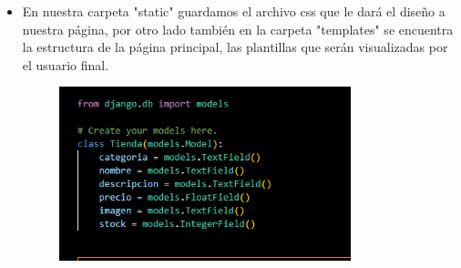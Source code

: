 \documentclass{article}
\begin{document}
 \begin{itemize}
		\item   En nuestra carpeta "static" guardamos el archivo css que le dará el diseño a nuestra página, por otro lado también en la carpeta "templates" se encuentra la estructura de la página principal, las plantillas que serán visualizadas por el usuario final. 
	\begin{figure}[H]
		\centering
		\includegraphics[width=0.8\textwidth,keepaspectratio]{Latex/img/models.png}
	\end{figure}
	\end{itemize}
\end{document}
